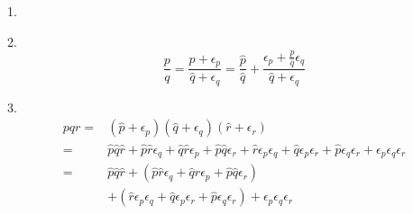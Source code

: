 1.

2.\begin{equation}
\frac{p}{q}=\frac{\hat{p}+\epsilon_{p}}{\hat{q}+\epsilon_{q}}=\frac{\hat{p}}{\hat{q}}+\frac{\epsilon_{p}+\frac{p}{\hat{q}} \epsilon_{q}}{\hat{q}+\epsilon_{q}}
\end{equation}


3.
\begin{equation}
\begin{aligned} p q r=&\left(\hat{p}+\epsilon_{p}\right)\left(\hat{q}+\epsilon_{q}\right)\left(\hat{r}+\epsilon_{r}\right) \\=& \hat{p} \hat{q} \hat{r}+\hat{p} \hat{r} \epsilon_{q}+\hat{q} \hat{r} \epsilon_{p}+\hat{p} \hat{q} \epsilon_{r}+\hat{r} \epsilon_{p} \epsilon_{q}+\hat{q} \epsilon_{p} \epsilon_{r}+\hat{p} \epsilon_{q} \epsilon_{r}+\epsilon_{p} \epsilon_{q} \epsilon_{r} \\=& \hat{p} \hat{q} \hat{r}+\left(\hat{p} \hat{r} \epsilon_{q}+\hat{q} \hat{r} \epsilon_{p}+\hat{p} \hat{q} \epsilon_{r}\right) \\ &+\left(\hat{r} \epsilon_{p} \epsilon_{q}+\hat{q} \epsilon_{p} \epsilon_{r}+\hat{p} \epsilon_{q} \epsilon_{r}\right)+\epsilon_{p} \epsilon_{q} \epsilon_{r} \end{aligned}
\end{equation}